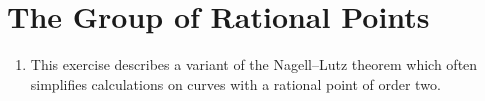 \documentclass[11pt, oneside]{article}
\begin{document}
\section{The Group of Rational Points}
\begin{enumerate}
\setlength{\parindent}{0pt}
%
%
%
%
%
\setcounter{enumi}{6}
\item This exercise describes a variant of the Nagell--Lutz theorem which often simplifies calculations on curves with a rational point of order two.\\

\end{enumerate}
\end{document}
